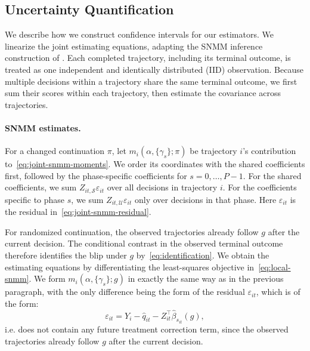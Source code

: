 
\subsection{Uncertainty Quantification}
\label{app:inference}

We describe how we construct confidence intervals for our estimators.
We linearize the joint estimating equations, adapting the SNMM inference
construction of \citet[Theorem~8]{lewis2021dynamic}.
Each completed trajectory, including its terminal outcome, is treated as
one independent and identically distributed (IID) observation.
Because multiple decisions within a trajectory share the same terminal
outcome, we first sum their scores within each trajectory, then estimate
the covariance across trajectories.


\paragraph{SNMM estimates.}
For a changed continuation $\pi$, let
$m_i(\alpha,\{\gamma_s\};\pi)$ be trajectory $i$'s contribution
to~\eqref{eq:joint-snmm-moments}. We order its coordinates with
the shared coefficients first, followed by the phase-specific
coefficients for $s=0,\ldots,P-1$. For the shared coefficients,
we sum $Z_{it,\mathcal S}\varepsilon_{it}$ over all decisions
in trajectory $i$. For the coefficients specific to phase $s$,
we sum $Z_{it,\mathcal U}\varepsilon_{it}$ only over decisions
in that phase. Here $\varepsilon_{it}$ is the residual
in~\eqref{eq:joint-snmm-residual}.

For randomized continuation, the observed trajectories already
follow $g$ after the current decision. The conditional contrast
in the observed terminal outcome therefore identifies the blip
under $g$ by~\eqref{eq:identification}. We obtain the estimating
equations by differentiating the least-squares objective
in~\eqref{eq:local-snmm}. We form $m_i(\alpha,\{\gamma_s\};g)$ in exactly the same way as in the previous paragraph, with the only difference being the form of the residual $\varepsilon_{it}$, which is of the form:
\[
\varepsilon_{it} = Y_i-\widehat q_{it}-Z_{it}^{\top}\widehat\beta_{s_{it}}(g),
\]
i.e. does not contain any future treatment correction term, since the observed trajectories already follow $g$ after the current decision.

